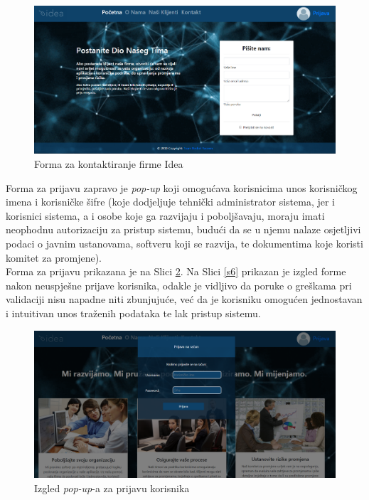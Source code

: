 \documentclass[12pt,a4paper]{article}
\begin{document}
\begin{figure}[H]
\center
\includegraphics[scale=0.35]{../res/UI/contact.PNG}
\caption{Forma za kontaktiranje firme Idea}
\label{s4}
\end{figure}

Forma za prijavu zapravo je \textit{pop-up} koji omogućava korisnicima unos korisničkog imena i korisničke šifre (koje dodjeljuje tehnički administrator sistema, jer i korisnici sistema, a i osobe koje ga razvijaju i poboljšavaju, moraju imati neophodnu autorizaciju za pristup sistemu, budući da se u njemu nalaze osjetljivi podaci o javnim ustanovama, softveru koji se razvija, te dokumentima koje koristi komitet za promjene). \\

Forma za prijavu prikazana je na Slici \ref{s5}. Na Slici \ref{s6} prikazan je izgled forme nakon neuspješne prijave korisnika, odakle je vidljivo da poruke o greškama pri validaciji nisu napadne niti zbunjujuće, već da je korisniku omogućen jednostavan i intuitivan unos traženih podataka te lak pristup sistemu.

\begin{figure}[H]
\center
\includegraphics[scale=0.35]{../res/UI/login.PNG}
\caption{Izgled \textit{pop-up}-a za prijavu korisnika}
\label{s5}
\end{figure}
\end{document}

